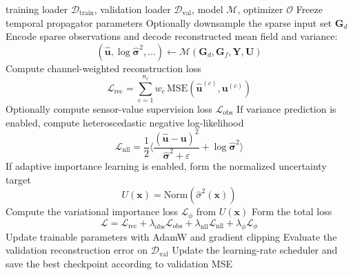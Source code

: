 
\begin{algorithm}[htbp]
\caption{Stage-0 reconstruction training (release protocol)}
\label{alg:stage0_train}
\begin{algorithmic}[1]
\Require training loader $\mathcal{D}_{\mathrm{train}}$, validation loader $\mathcal{D}_{\mathrm{val}}$, model $\mathcal{M}$, optimizer $\mathcal{O}$
\State Freeze temporal propagator parameters
        \State Optionally downsample the sparse input set $\mathbf{G}_d$
        \State Encode sparse observations and decode reconstructed mean field and variance:
        \[
            (\hat{\mathbf{u}}, \log \hat{\boldsymbol{\sigma}}^2, \ldots) \leftarrow \mathcal{M}(\mathbf{G}_d,\mathbf{G}_f,\mathbf{Y},\mathbf{U})
        \]
        \State Compute channel-weighted reconstruction loss
        \[
            \mathcal{L}_{\mathrm{rec}} = \sum_{c=1}^{n_c} w_c\,\mathrm{MSE}(\hat{\mathbf{u}}^{(c)},\mathbf{u}^{(c)})
        \]
        \State Optionally compute sensor-value supervision loss $\mathcal{L}_{\mathrm{obs}}$
        \State If variance prediction is enabled, compute heteroscedastic negative log-likelihood
        \[
            \mathcal{L}_{\mathrm{nll}} = \frac{1}{2}\Big\langle \frac{(\hat{\mathbf{u}}-\mathbf{u})^2}{\hat{\boldsymbol{\sigma}}^2+\varepsilon} + \log \hat{\boldsymbol{\sigma}}^2 \Big\rangle
        \]
        \State If adaptive importance learning is enabled, form the normalized uncertainty target
        \[
            U(\mathbf{x}) = \mathrm{Norm}(\hat{\sigma}^2(\mathbf{x}))
        \]
        \State Compute the variational importance loss $\mathcal{L}_{\phi}$ from $U(\mathbf{x})$
        \State Form the total loss
        \[
            \mathcal{L} = \mathcal{L}_{\mathrm{rec}} + \lambda_{\mathrm{obs}}\mathcal{L}_{\mathrm{obs}} + \lambda_{\mathrm{nll}}\mathcal{L}_{\mathrm{nll}} + \lambda_{\phi}\mathcal{L}_{\phi}
        \]
        \State Update trainable parameters with AdamW and gradient clipping
    \EndFor
    \State Evaluate the validation reconstruction error on $\mathcal{D}_{\mathrm{val}}$
    \State Update the learning-rate scheduler and save the best checkpoint according to validation MSE
\EndFor
\end{algorithmic}
\end{algorithm}

